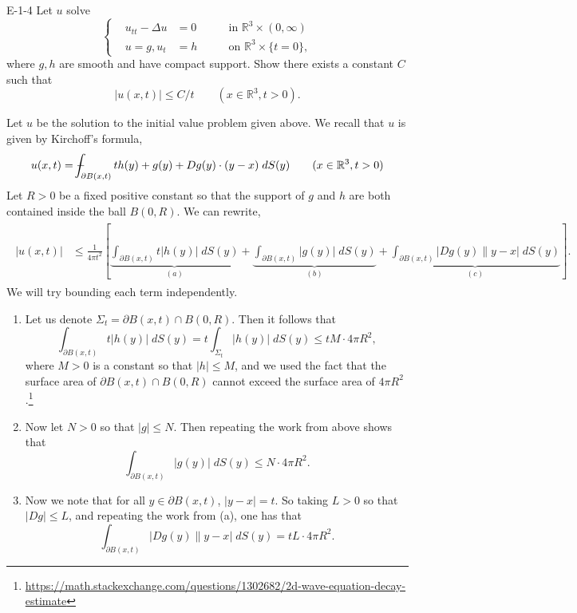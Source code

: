 \documentclass{article}
\def\Xint#1{\mathchoice
	{\XXint\displaystyle\textstyle{#1}}%
	{\XXint\textstyle\scriptstyle{#1}}%
	{\XXint\scriptstyle\scriptscriptstyle{#1}}%
	{\XXint\scriptscriptstyle\scriptscriptstyle{#1}}%
	\!\int}
\def\XXint#1#2#3{{\setbox0=\hbox{$#1{#2#3}{\int}$ }
		\vcenter{\hbox{$#2#3$ }}\kern-.6 \wd0}}
\def\dashint{\Xint-}
\begin{document}
	\begin{prb}{E-1-4}
		Let $u$ solve 
		\begin{equation*}
			\left\{
			\begin{alignedat}{3}
				&u_{tt} - \Delta u &=0 &\qquad \text{in $\mathbb{R}^3 \times (0,\infty)$} \\
				&u = g, u_t &= h &\qquad \text{on $\mathbb{R}^3 \times \{t = 0\}$},
			\end{alignedat}
			\right.
		\end{equation*}
		where $g, h$ are smooth and have compact support. Show there exists a constant $C$ such that 
		\begin{equation*}
			|u(x,t)| \leq C/t \qquad (x \in \mathbb{R}^3, t > 0). 
		\end{equation*}
	\end{prb}
	Let $u$ be the solution to the initial value problem given above. We recall that $u$ is given by Kirchoff's formula, 
	\begin{equation*}
		u(x,t) = \dashint_{\partial B(x,t)}th(y) + g(y) + Dg(y) \cdot (y - x)\;dS(y) \qquad (x \in \mathbb{R}^3, t > 0)
	\end{equation*}
	Let $R > 0$ be a fixed positive constant so that the support of $g$ and $h$ are both contained inside the ball $B(0,R)$. We can rewrite, 
	\begin{align*}
		\begin{split}
			|u(x,t)| &\leq \frac{1}{4\pi t^2}\left[\underbrace{\int_{\partial B(x,t)}t|h(y)|\;dS(y)}_{(a)} + \underbrace{\int_{\partial B(x,t)}|g(y)|\;dS(y)}_{(b)} + \underbrace{\int_{\partial B(x,t)}|Dg(y)\|y-x|\;dS(y)}_{(c)}\right]. 
		\end{split}
	\end{align*}
	We will try bounding each term independently. 
	\begin{enumerate}[itemsep =-2pt,label = (\alph{*})]
		\item Let us denote $\Sigma_t = \partial B(x,t) \cap B(0,R)$. Then it follows that 
		\begin{equation*}
			\int_{\partial B(x,t)}t|h(y)|\;dS(y) = t\int_{\Sigma_t}|h(y)|\;dS(y) \leq tM\cdot 4\pi R^2, 
		\end{equation*}
		where $M > 0$ is a constant so that $|h|\leq M$, and we used the fact that the surface area of $\partial B(x,t) \cap B(0,R)$ cannot exceed the surface area of $4\pi R^2$.\footnote{\href{https://math.stackexchange.com/questions/1302682/2d-wave-equation-decay-estimate}{https://math.stackexchange.com/questions/1302682/2d-wave-equation-decay-estimate}} 
		\item Now let $N > 0$ so that $|g|\leq N$. Then repeating the work from above shows that 
		\begin{equation*}
			\int_{\partial B(x,t)}|g(y)|\;dS(y) \leq N \cdot 4\pi R^2.
		\end{equation*}
		\item Now we note that for all $y \in \partial B(x,t)$, $|y - x| = t$. So taking $L > 0$ so that $|Dg| \leq L$, and repeating the work from (a), one has that 
		\begin{equation*}
			\int_{\partial B(x,t)}|Dg(y)\|y - x|\;dS(y) = t L \cdot 4\pi R^2. 
		\end{equation*}
	\end{enumerate}
\end{document}
